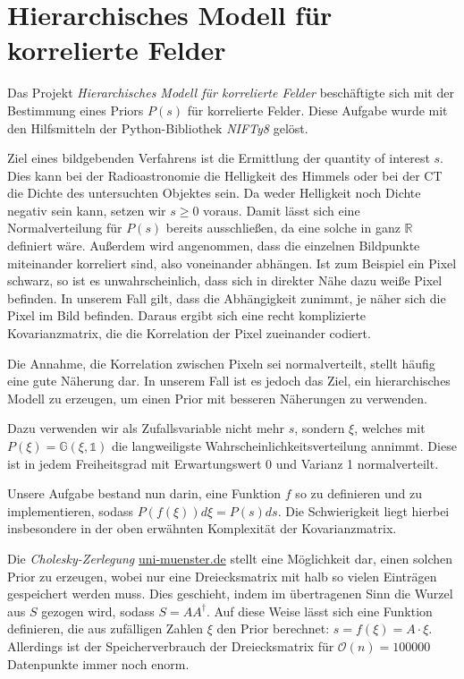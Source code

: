 \section{Hierarchisches Modell für korrelierte Felder}\label{k4.2.hmodel}
Das Projekt \emph{Hierarchisches Modell für korrelierte Felder} beschäftigte sich mit der Bestimmung eines Priors $P(s)$ für korrelierte Felder. Diese Aufgabe wurde mit den Hilfsmitteln der Python-Bibliothek \emph{NIFTy8} gelöst.

Ziel eines bildgebenden Verfahrens ist die Ermittlung der quantity of interest $s$. Dies kann bei der Radioastronomie die Helligkeit des Himmels oder bei der CT die Dichte des untersuchten Objektes sein. Da weder Helligkeit noch Dichte negativ sein kann, setzen wir $s \geq 0$ voraus. Damit lässt sich eine Normalverteilung für $P(s)$ bereits ausschließen, da eine solche in ganz $\mathbb{R}$ definiert wäre. Außerdem wird angenommen, dass die einzelnen Bildpunkte miteinander korreliert sind, also voneinander abhängen. Ist zum Beispiel ein Pixel schwarz, so ist es unwahrscheinlich, dass sich in direkter Nähe dazu weiße Pixel befinden. In unserem Fall gilt, dass die Abhängigkeit zunimmt, je näher sich die Pixel im Bild befinden. Daraus ergibt sich eine recht komplizierte Kovarianzmatrix, die die Korrelation der Pixel zueinander codiert.

Die Annahme, die Korrelation zwischen Pixeln sei normalverteilt, stellt häufig eine gute Näherung dar. In unserem Fall ist es jedoch das Ziel, ein hierarchisches Modell zu erzeugen, um einen Prior mit besseren Näherungen zu verwenden.

Dazu verwenden wir als Zufallsvariable nicht mehr $s$, sondern $\xi$, welches mit $P(\xi) = \mathbb{G}(\xi, \mathds{1})$ die langweiligste Wahrscheinlichkeitsverteilung annimmt. Diese ist in jedem Freiheitsgrad mit Erwartungswert 0 und Varianz 1 normalverteilt.

Unsere Aufgabe bestand nun darin, eine Funktion $f$ so zu definieren und zu implementieren, sodass $P(f(\xi)) d \xi = P(s) ds$. Die Schwierigkeit liegt hierbei insbesondere in der oben erwähnten Komplexität der Kovarianzmatrix.

Die \emph{Cholesky-Zerlegung} \href{https://www.uni-muenster.de/AMM/num/Vorlesungen/Numerik1_WS06/loesungen06/Prog_cholesky.pdf}{uni-muenster.de}
stellt eine Möglichkeit dar, einen solchen Prior zu erzeugen, wobei nur eine Dreiecksmatrix mit halb so vielen Einträgen gespeichert werden muss. Dies geschieht, indem im übertragenen Sinn die Wurzel aus $S$ gezogen wird, sodass $S=A A^{\dagger}$. Auf diese Weise lässt sich eine Funktion definieren, die aus zufälligen Zahlen $\xi$ den Prior berechnet: $s = f(\xi) = A \cdot \xi$. Allerdings ist der Speicherverbrauch der Dreiecksmatrix für $\mathcal{O}(n) = 100 000$ Datenpunkte immer noch enorm.

